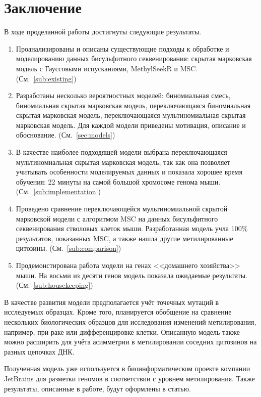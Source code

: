
\section*{Заключение}

В ходе проделанной работы достигнуты следующие результаты.

\begin{enumerate}
\item Проанализированы и описаны существующие подходы к обработке и моделированию данных бисульфитного
  секвенирования: скрытая марковская модель с Гауссовыми испусканиями, MethylSeekR и MSC.
  (См.~\ref{sub:existing})
\item Разработаны несколько вероятностных моделей: биномиальная смесь, биномиальная скрытая
  марковская модель, переключающаяся биномиальная скрытая марковская модель, переключающаяся
  мультиномиальная скрытая марковская модель. Для каждой модели приведены мотивация, описание и
  обоснование. (См.~\ref{sec:models})
\item В качестве наиболее подходящей модели выбрана переключающаяся мультиномиальная скрытая марковская
  модель, так как она позволяет учитывать особенности моделируемых данных и показала хорошее время
  обучения: 22 минуты на самой большой хромосоме генома мыши. (См.~\ref{sub:implementation})
\item Проведено сравнение переключающейся мультиномиальной скрытой марковской модели с алгоритмом MSC на
  данных бисульфитного секвенирования стволовых клеток мыши. Разработанная модель учла 100\%
  результатов, показанных MSC, а также нашла другие метилированные цитозины.
  (См.~\ref{sub:comparison})
\item Продемонстирована работа модели на генах <<домашнего хозяйства>> мыши. На восьми из десяти
  генов модель показала ожидаемые результаты. (См.~\ref{sub:housekeeping})
\end{enumerate}

В качестве развития модели предполагается учёт точечных мутаций в исследуемых образцах. Кроме того,
планируется обобщение на сравнение нескольких биологических образцов для исследования изменений
метилирования, например, при раке или дифференцировке клетки. Описанную модель также можно расширить
для учёта асимметрии в метилировании соседних цитозинов на разных цепочках ДНК.

Полученная модель уже используется в биоинформатическом проекте компании JetBrains для разметки геномов в
соответствии с уровнем метилирования. Также результаты, описанные в работе, будут оформлены в
статью.

